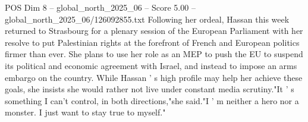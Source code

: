 \begin{textsample}{POS Dim 8 – global\_north\_2025\_06 – Score 5.00 – global\_north\_2025\_06/126092855.txt}
Following her ordeal, Hassan this week returned to Strasbourg for a plenary session of the European Parliament with her resolve to put Palestinian rights at the forefront of French and European politics firmer than ever.
She plans to use her role as an MEP to push the EU to suspend its political and economic agreement with Israel, and instead to impose an arms embargo on the country.
While Hassan ' s high profile may help her achieve these goals, she insists she would rather not live under constant media scrutiny."It ' s something I can't control, in both directions,"she said."I ' m neither a hero nor a monster.
I just want to stay true to myself."

\end{textsample}
